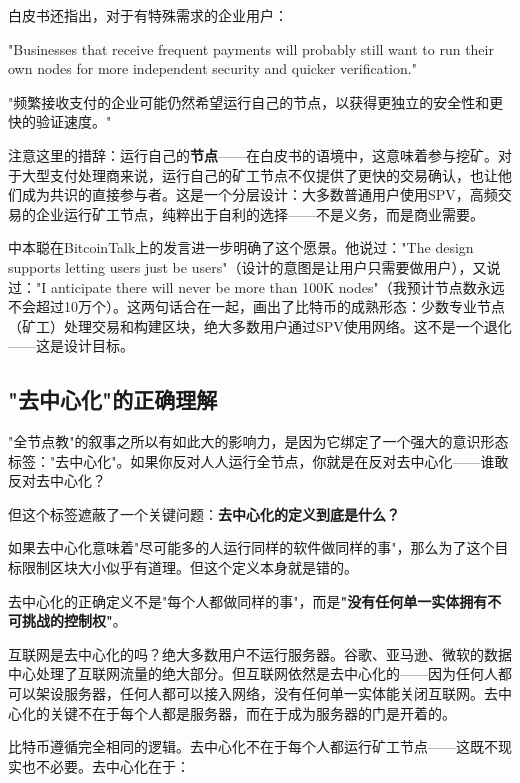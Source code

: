 \documentclass[a4paper,12pt,openany]{ctexbook}
\newenvironment{quoting}{%
  \par\vspace{0.5em}%
  \begin{list}{}{%
    \setlength{\leftmargin}{2em}%
    \setlength{\rightmargin}{2em}%
    \setlength{\parsep}{0.3em}%
    \setlength{\itemsep}{0pt}%
    \setlength{\topsep}{0pt}%
  }%
  \item\relax
}{%
  \end{list}%
  \par\vspace{0.5em}%
}
\begin{document}
白皮书还指出，对于有特殊需求的企业用户：


\begin{quoting}
\small
"Businesses that receive frequent payments will probably still want to run their own nodes for more independent security and quicker verification."

"频繁接收支付的企业可能仍然希望运行自己的节点，以获得更独立的安全性和更快的验证速度。"
\end{quoting}


注意这里的措辞：运行自己的\textbf{节点}——在白皮书的语境中，这意味着参与挖矿。对于大型支付处理商来说，运行自己的矿工节点不仅提供了更快的交易确认，也让他们成为共识的直接参与者。这是一个分层设计：大多数普通用户使用SPV，高频交易的企业运行矿工节点，纯粹出于自利的选择——不是义务，而是商业需要。

中本聪在BitcoinTalk上的发言进一步明确了这个愿景。他说过："The design supports letting users just be users"（设计的意图是让用户只需要做用户），又说过："I anticipate there will never be more than 100K nodes"（我预计节点数永远不会超过10万个）。这两句话合在一起，画出了比特币的成熟形态：少数专业节点（矿工）处理交易和构建区块，绝大多数用户通过SPV使用网络。这不是一个退化——这是设计目标。


\subsection*{"去中心化"的正确理解}


"全节点教"的叙事之所以有如此大的影响力，是因为它绑定了一个强大的意识形态标签："去中心化"。如果你反对人人运行全节点，你就是在反对去中心化——谁敢反对去中心化？

但这个标签遮蔽了一个关键问题：\textbf{去中心化的定义到底是什么？}

如果去中心化意味着"尽可能多的人运行同样的软件做同样的事"，那么为了这个目标限制区块大小似乎有道理。但这个定义本身就是错的。

去中心化的正确定义不是"每个人都做同样的事"，而是\textbf{"没有任何单一实体拥有不可挑战的控制权"}。

互联网是去中心化的吗？绝大多数用户不运行服务器。谷歌、亚马逊、微软的数据中心处理了互联网流量的绝大部分。但互联网依然是去中心化的——因为任何人都可以架设服务器，任何人都可以接入网络，没有任何单一实体能关闭互联网。去中心化的关键不在于每个人都是服务器，而在于成为服务器的门是开着的。

比特币遵循完全相同的逻辑。去中心化不在于每个人都运行矿工节点——这既不现实也不必要。去中心化在于：
\end{document}

